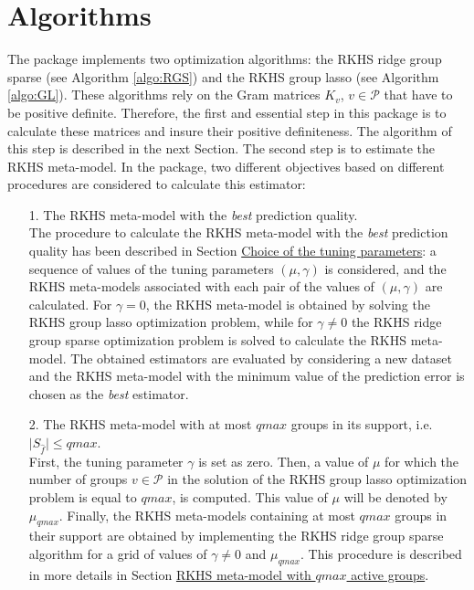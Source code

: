 \section{Algorithms}\label{sec:Optalgo}
The  package implements two optimization algorithms: the RKHS ridge group sparse (see Algorithm \ref{algo:RGS}) and the RKHS group lasso (see Algorithm \ref{algo:GL}). These algorithms rely on the Gram matrices $K_v$, $v\in\mathcal{P}$ that have to be positive definite. Therefore, the first and essential step in this package is to calculate these matrices and insure their positive definiteness. The algorithm of this step is described in the next Section. The second step is to estimate the RKHS meta-model. In the  package, two different objectives based on different procedures are considered to calculate this estimator:
\begin{itemize}
\item[1.] The RKHS meta-model with the \textit{best} prediction quality.\\
The procedure to calculate the RKHS meta-model with the \textit{best} prediction quality has been described in Section \hyperref[subsec:Err]{Choice of the tuning parameters}: a sequence of values of the tuning parameters $(\mu,\gamma)$ is considered, and the RKHS meta-models associated with each pair of the values of $(\mu,\gamma )$ are calculated. For $\gamma=0$, the RKHS meta-model is obtained by solving the RKHS group lasso optimization problem, while for $\gamma\neq 0$ the RKHS ridge group sparse optimization problem is solved to calculate the RKHS meta-model. The obtained estimators are evaluated by considering a new dataset and the RKHS meta-model with the minimum value of the prediction error is chosen as the \textit{best} estimator.
\item[2.] The RKHS meta-model with at most $qmax$ groups in its support, i.e. $\vert S_{\widehat{f}}\vert\leq qmax$.\\
First, the tuning parameter $\gamma$ is set as zero. Then, a value of $\mu$ for which the number of groups $v\in\mathcal{P}$ in the solution of the RKHS group lasso optimization problem is equal to $qmax$, is computed. This value of $\mu$ will be denoted by $\mu_{qmax}$. Finally, the RKHS meta-models containing at most $qmax$ groups in their support are obtained by implementing the RKHS ridge group sparse algorithm for a grid of values of $\gamma\neq0$ and $\mu_{qmax}$. This procedure is described in more details in Section \hyperref[subsec:optimqmax]{RKHS meta-model with $qmax$ active groups}.
\end{itemize}
